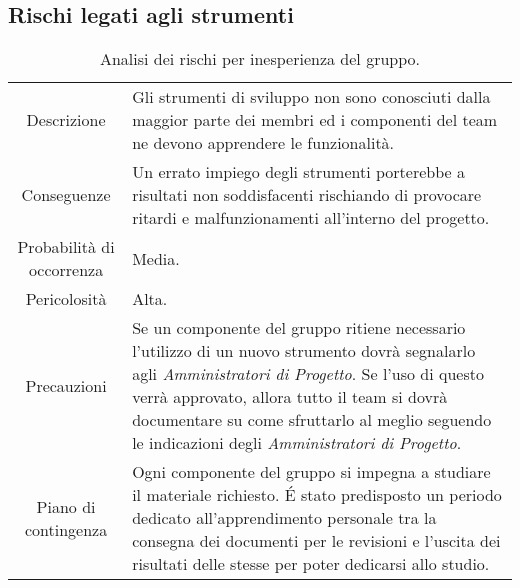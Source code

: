 \subsection{Rischi legati agli strumenti}
\begin{table}[H]
    \begin{tabular}{|c | p{10cm}|}
    \rowcolor{darkblue} \hline
    \multicolumn{2}{|c|}{\textcolor{white}{\textbf{RS1 - Inesperienza del gruppo}}}\\ \hline
    Descrizione & Gli strumenti di sviluppo non sono conosciuti dalla maggior parte dei membri ed i componenti del team ne devono apprendere le funzionalità.\\ \hline
    Conseguenze & Un errato impiego degli strumenti porterebbe a risultati non soddisfacenti rischiando di provocare ritardi e malfunzionamenti all'interno del progetto.\\ \hline
    Probabilità di occorrenza & Media.\\ \hline
    Pericolosità & Alta.\\ \hline
    Precauzioni & Se un componente del gruppo ritiene necessario l'utilizzo di un nuovo strumento dovrà segnalarlo agli \textit{Amministratori di Progetto}. Se l'uso di questo verrà approvato, allora tutto il team si dovrà documentare su come sfruttarlo al meglio seguendo le indicazioni degli \textit{Amministratori di Progetto}.\\ \hline
    Piano di contingenza & Ogni componente del gruppo si impegna a studiare il materiale richiesto. É stato predisposto un periodo dedicato all'apprendimento personale tra la consegna dei documenti per le revisioni e l'uscita dei risultati delle stesse per poter dedicarsi allo studio.\\ \hline
    \end{tabular}
    \caption{\label{tab:RS1}Analisi dei rischi per inesperienza del gruppo.}
\end{table}